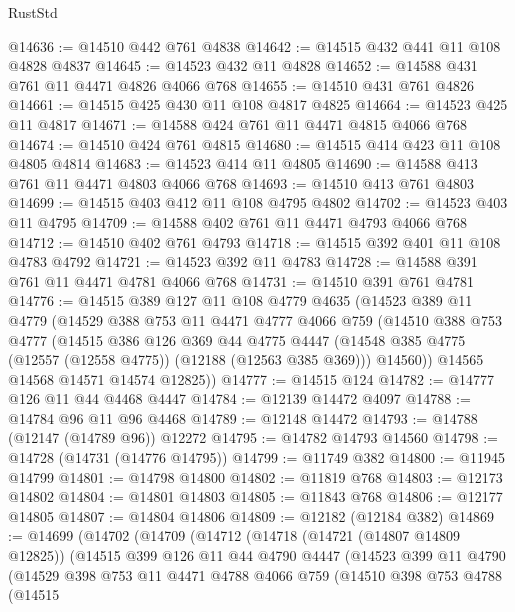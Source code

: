\begin{lexlean}{RustStd}
\begin{coremodule}
{\begin{coremodule}
{{{{{{{{{{{{{{{{{{{{{{{{{{{{{{{{{{{{{{{{{{{{{{{{{{{{{{{{{{{{{{{{{{{{@14636 := @14510 @442 @761 @4838
@14642 := @14515 @432 @441 @11 @108 @4828 @4837
@14645 := @14523 @432 @11 @4828
@14652 := @14588 @431 @761 @11 @4471 @4826 @4066 @768
@14655 := @14510 @431 @761 @4826
@14661 := @14515 @425 @430 @11 @108 @4817 @4825
@14664 := @14523 @425 @11 @4817
@14671 := @14588 @424 @761 @11 @4471 @4815 @4066 @768
@14674 := @14510 @424 @761 @4815
@14680 := @14515 @414 @423 @11 @108 @4805 @4814
@14683 := @14523 @414 @11 @4805
@14690 := @14588 @413 @761 @11 @4471 @4803 @4066 @768
@14693 := @14510 @413 @761 @4803
@14699 := @14515 @403 @412 @11 @108 @4795 @4802
@14702 := @14523 @403 @11 @4795
@14709 := @14588 @402 @761 @11 @4471 @4793 @4066 @768
@14712 := @14510 @402 @761 @4793
@14718 := @14515 @392 @401 @11 @108 @4783 @4792
@14721 := @14523 @392 @11 @4783
@14728 := @14588 @391 @761 @11 @4471 @4781 @4066 @768
@14731 := @14510 @391 @761 @4781
@14776 := @14515
    @389
    @127
    @11
    @108
    @4779
    @4635
    (@14523
      @389
      @11
      @4779
      (@14529
        @388
        @753
        @11
        @4471
        @4777
        @4066
        @759
        (@14510
          @388
          @753
          @4777
          (@14515
            @386
            @126
            @369
            @44
            @4775
            @4447
            (@14548 @385 @4775 (@12557 (@12558 @4775)) (@12188 (@12563 @385 @369)))
            @14560))
        @14565
        @14568
        @14571
        @14574
        @12825))
@14777 := @14515 @124
@14782 := @14777 @126 @11 @44 @4468 @4447
@14784 := @12139 @14472 @4097
@14788 := @14784 @96 @11 @96 @4468
@14789 := @12148 @14472
@14793 := @14788 (@12147 (@14789 @96)) @12272
@14795 := @14782 @14793 @14560
@14798 := @14728 (@14731 (@14776 @14795))
@14799 := @11749 @382
@14800 := @11945 @14799
@14801 := @14798 @14800
@14802 := @11819 @768
@14803 := @12173 @14802
@14804 := @14801 @14803
@14805 := @11843 @768
@14806 := @12177 @14805
@14807 := @14804 @14806
@14809 := @12182 (@12184 @382)
@14869 := @14699
    (@14702
      (@14709
        (@14712
          (@14718
            (@14721 (@14807 @14809 @12825))
            (@14515
              @399
              @126
              @11
              @44
              @4790
              @4447
              (@14523
                @399
                @11
                @4790
                (@14529
                  @398
                  @753
                  @11
                  @4471
                  @4788
                  @4066
                  @759
                  (@14510
                    @398
                    @753
                    @4788
                    (@14515
}}}}}}}}}}}}}}}}}}}}}}}}}}}}}}}}}}}}}}}}}}}}}}}}}}}}}}}}}}}}}}}}}}}}
\end{coremodule}}
\end{coremodule}
\end{lexlean}

